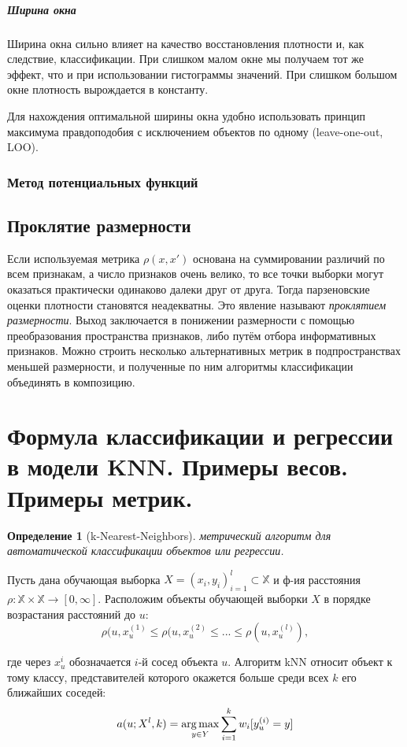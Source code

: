 \documentclass[a4paper, 12pt]{article}
\newcommand{\argmax}{\mathop{\rm arg\,max}\limits}
\theoremstyle{plain} %
\newtheorem{definition}{Определение}
\theoremstyle{definition} %
\theoremstyle{remark} %
\begin{document}
\subparagraph{Ширина окна}
Ширина окна сильно влияет на качество восстановления плотности и, как следствие, классификации. При слишком малом окне мы получаем тот же эффект, что и при использовании гистограммы значений. При слишком большом окне плотность вырождается в константу.

Для нахождения оптимальной ширины окна удобно использовать принцип максимума правдоподобия с исключением объектов по одному (leave-one-out, LOO).

\subsubsection{Метод потенциальных функций}

\subsection{Проклятие размерности}

Если используемая метрика $\rho(x,x′)$ основана на суммировании различий по всем признакам, а число признаков очень велико, то все точки выборки могут оказаться практически одинаково далеки друг от друга. Тогда парзеновские оценки плотности становятся неадекватны. Это явление называют \emph{проклятием размерности}. Выход заключается в понижении размерности с помощью преобразования пространства признаков, либо путём отбора информативных признаков. Можно строить несколько альтернативных метрик в подпространствах меньшей размерности, и полученные по ним алгоритмы классификации объединять в композицию.

\section{Формула классификации и регрессии в модели KNN. Примеры весов. Примеры метрик.}

\begin{definition}[k-Nearest-Neighbors]
	метрический алгоритм для автоматической классификации объектов или регрессии.
\end{definition}

Пусть дана обучающая выборка $X = (x_{i}, y_{i})^{l}_{i=1} \subset \mathbb{X}$ и ф-ия расстояния $\rho : \mathbb{X} \times \mathbb{X} \to [0, \infty]$. Расположим объекты обучающей выборки $X$ в порядке возрастания расстояний до $u$:
\[
	\rho(u, x_{u}^{(1)} \leqslant \rho(u, x_{u}^{(2)} \leqslant ... \leqslant \rho(u, x_{u}^{(l)}),
\]

где через $x_{u}^{i}$ обозначается $i$-й сосед объекта $u$. Алгоритм kNN относит объект к тому классу, представителей которого окажется больше среди всех $k$ его ближайших соседей:
\[
	a(u; X^{l}, k) = \underset{y \in Y}{\argmax} \sum^{k}_{i=1}w_{i}[y_{u}^{(i)} = y]
\]
\end{document}
